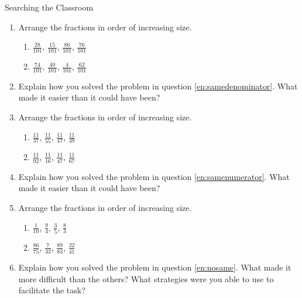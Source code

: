 \begin{act}Searching the Classroom\end{act}
\begin{enumerate}
\item \label{en:samedenominator}Arrange the fractions in order of increasing size.
\begin{enumerate}
\item $\frac{28}{101}$, $\frac{15}{101}$, $\frac{86}{101}$, $\frac{76}{101}$
\item $\frac{74}{101}$, $\frac{40}{101}$, $\frac{4}{101}$, $\frac{62}{101}$
\end{enumerate}
\item Explain how you solved the problem in question \ref{en:samedenominator}. What made it easier than it could have been?
\item \label{en:samenumerator}Arrange the fractions in order of increasing size.
\begin{enumerate}
\item $\frac{11}{37}$, $\frac{11}{55}$, $\frac{11}{47}$, $\frac{11}{49}$
\item $\frac{11}{92}$, $\frac{11}{16}$, $\frac{11}{47}$, $\frac{11}{67}$
\end{enumerate}
\item Explain how you solved the problem in question \ref{en:samenumerator}. What made it easier than it could have been?
\item \label{en:nosame}Arrange the fractions in order of increasing size.
\begin{enumerate}
\item $\frac{1}{10}$, $\frac{9}{4}$, $\frac{3}{5}$, $\frac{8}{3}$
\item $\frac{86}{75}$, $\frac{7}{33}$, $\frac{89}{83}$, $\frac{22}{41}$
\end{enumerate}
\item Explain how you solved the problem in question \ref{en:nosame}. What made it more difficult than the others? What strategies were you able to use to facilitate the task? 
\end{enumerate}
